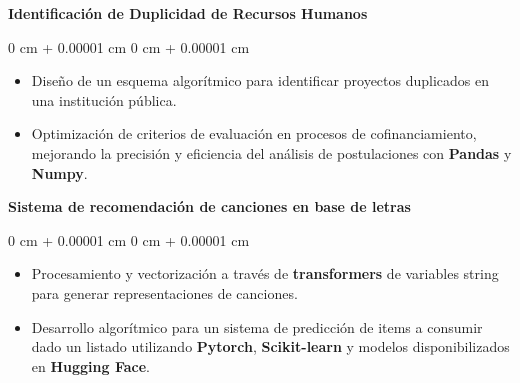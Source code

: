 \documentclass[10pt, letterpaper]{article}
\newenvironment{highlights}{
    \begin{itemize}[
        topsep=0.10 cm,
        parsep=0.10 cm,
        partopsep=0pt,
        itemsep=0pt,
        leftmargin=0 cm + 10pt
    ]
}{
    \end{itemize}
} %
\newenvironment{onecolentry}{
    \begin{adjustwidth}{
        0 cm + 0.00001 cm
    }{
        0 cm + 0.00001 cm
    }
}{
    \end{adjustwidth}
} %
\begin{document}
    \textbf{Identificación de Duplicidad de Recursos Humanos}
\vspace{0.10 cm}
\begin{onecolentry}
    \begin{highlights}
    \item Diseño de un esquema algorítmico para identificar proyectos duplicados en una institución pública.
    \item Optimización de criterios de evaluación en procesos de cofinanciamiento, mejorando la precisión y eficiencia del análisis de postulaciones con \textbf{Pandas} y \textbf{Numpy}.
    \end{highlights}
\end{onecolentry}
\vspace{0.2 cm}

    \textbf{Sistema de recomendación de canciones en base de letras}
\vspace{0.10 cm}
\begin{onecolentry}
    \begin{highlights}
    \item Procesamiento y vectorización a través de \textbf{transformers} de variables string para generar representaciones de canciones.
    \item Desarrollo algorítmico para un sistema de predicción de items a consumir dado un listado utilizando \textbf{Pytorch}, \textbf{Scikit-learn} y modelos disponibilizados en \textbf{Hugging Face}.
    \end{highlights}
\end{onecolentry}
\end{document}
